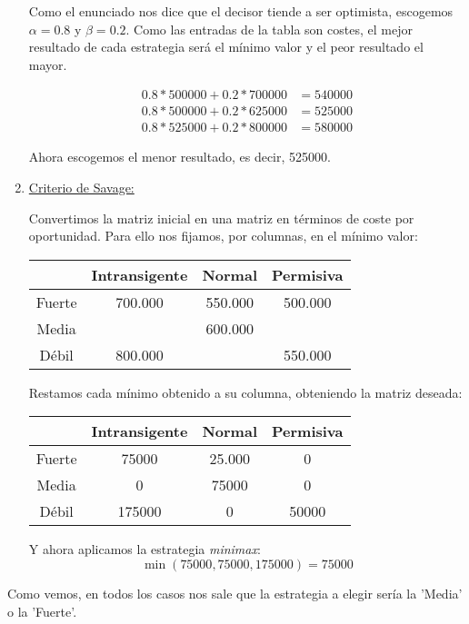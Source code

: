 \documentclass[12pt]{article}
\theoremstyle{definition}
\theoremstyle{remark}
\begin{document}
\begin{enumerate}
Como el enunciado nos dice que el decisor tiende a ser optimista, escogemos $\alpha=0.8$ y $\beta=0.2$. Como las entradas de la tabla son costes, el mejor resultado de cada estrategia será el mínimo valor y el peor resultado el mayor.

\[
\begin{array}{cc}
0.8 * 500000 + 0.2 * 700000 & = 540000 \\
0.8 * 500000 + 0.2 * 625000 & = 525000 \\
0.8 * 525000 + 0.2 * 800000 & = 580000
\end{array}
\]

Ahora escogemos el menor resultado, es decir, 525000.

\item \underline{Criterio de Savage:}

Convertimos la matriz inicial en una matriz en términos de coste por oportunidad. Para ello nos fijamos, por columnas, en el mínimo valor:

\begin{center}
\begin{tabular}{|c|c|c|c|}
\hline 
 & Intransigente & Normal& Permisiva\\ 
\hline 
Fuerte & 700.000 & 550.000 & 500.000 \\ 
\hline 
Media & \color{red}{625.000} & 600.000 & \color{red}{500.000} \\ 
\hline 
Débil & 800.000 & \color{red}{525.000} & 550.000 \\ 
\hline 
\end{tabular} 
\end{center}

Restamos cada mínimo obtenido a su columna, obteniendo la matriz deseada:

\begin{center}
\begin{tabular}{|c|c|c|c|}
\hline 
 & Intransigente & Normal& Permisiva\\ 
\hline 
Fuerte & 75000 & 25.000 & 0 \\ 
\hline 
Media & 0 & 75000 & 0 \\ 
\hline 
Débil & 175000 & 0 & 50000 \\ 
\hline 
\end{tabular} 
\end{center}

Y ahora aplicamos la estrategia \textit{minimax}:
\[
\min(75000,75000,175000)=75000
\]

\end{enumerate}


Como vemos, en todos los casos nos sale que la estrategia a elegir sería la 'Media' o la 'Fuerte'.
\end{document}
